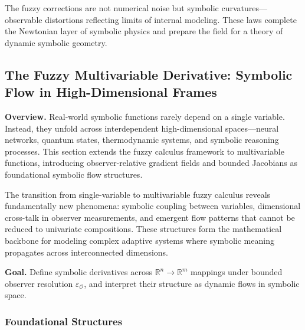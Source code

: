 \begin{scholium}
\label{scholium:bk4_reflexive_physics_emergence}
The fuzzy corrections are not numerical noise but symbolic curvatures—observable distortions reflecting limits of internal modeling. These laws complete the Newtonian layer of symbolic physics and prepare the field for a theory of dynamic symbolic geometry.
\end{scholium}

\subsection{The Fuzzy Multivariable Derivative: Symbolic Flow in High-Dimensional Frames}
\label{subsec:bk4_fuzzy_multivar_derivative}

\textbf{Overview.} Real-world symbolic functions rarely depend on a single variable. Instead, they unfold across interdependent high-dimensional spaces—neural networks, quantum states, thermodynamic systems, and symbolic reasoning processes. This section extends the fuzzy calculus framework to multivariable functions, introducing observer-relative gradient fields and bounded Jacobians as foundational symbolic flow structures.

The transition from single-variable to multivariable fuzzy calculus reveals fundamentally new phenomena: symbolic coupling between variables, dimensional cross-talk in observer measurements, and emergent flow patterns that cannot be reduced to univariate compositions. These structures form the mathematical backbone for modeling complex adaptive systems where symbolic meaning propagates across interconnected dimensions.

\textbf{Goal.} Define symbolic derivatives across $\mathbb{R}^n \to \mathbb{R}^m$ mappings under bounded observer resolution $\varepsilon_{\mathcal{O}}$, and interpret their structure as dynamic flows in symbolic space.

\subsubsection{Foundational Structures}

